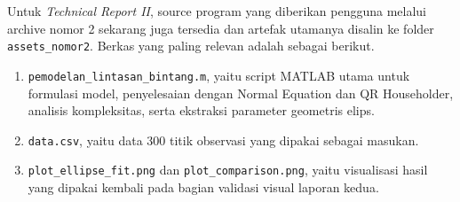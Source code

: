 \documentclass[12pt,a4paper]{article}
\begin{document}
Untuk \emph{Technical Report II}, source program yang diberikan pengguna melalui archive nomor 2 sekarang juga tersedia dan artefak utamanya disalin ke folder \texttt{assets\_nomor2}. Berkas yang paling relevan adalah sebagai berikut.
\begin{enumerate}[leftmargin=1.5em]
  \item \texttt{pemodelan\_lintasan\_bintang.m}, yaitu script MATLAB utama untuk formulasi model, penyelesaian dengan Normal Equation dan QR Householder, analisis kompleksitas, serta ekstraksi parameter geometris elips.
  \item \texttt{data.csv}, yaitu data 300 titik observasi yang dipakai sebagai masukan.
  \item \texttt{plot\_ellipse\_fit.png} dan \texttt{plot\_comparison.png}, yaitu visualisasi hasil yang dipakai kembali pada bagian validasi visual laporan kedua.
\end{enumerate}
\end{document}
